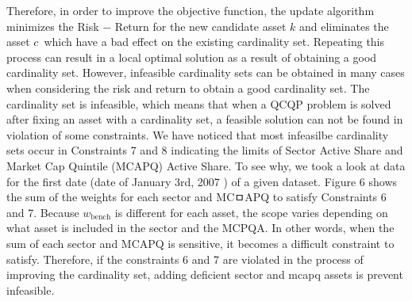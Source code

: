 \documentclass[11pt]{article}
\begin{document}
	Therefore, in order to improve the objective function, the update algorithm minimizes the Risk $-$ Return for the new candidate asset $k$ and eliminates the asset $c$\textasciiacute$\,$ which have a bad effect on the existing cardinality set. Repeating this process can result in a local optimal solution as a result of obtaining a good cardinality set. However, infeasible cardinality sets can be obtained in many cases when considering the risk and return to obtain a good cardinality set. The cardinality set is infeasible, which means that when a QCQP problem is solved after fixing an asset with a cardinality set, a feasible solution can not be found in violation of some constraints. We have noticed that most infeasilbe cardinality sets occur in Constraints 7 and 8 indicating the limits of Sector Active Share and Market Cap Quintile (MCAPQ) Active Share.
	To see why, we took a look at data for the first date (date of January 3rd, 2007 ) of a given dataset. Figure 6 shows the sum of the weights for each sector and MCㅁAPQ to satisfy Constraints 6 and 7. Because $w_\text{bench} $ is different for each asset, the scope varies depending on what asset is included in the sector and the MCPQA. In other words, when the sum of each sector and MCAPQ is sensitive, it becomes a difficult constraint to satisfy. Therefore, if the constraints 6 and 7 are violated in the process of improving the cardinality set, adding deficient sector and mcapq assets is prevent infeasible. 
\end{document}
